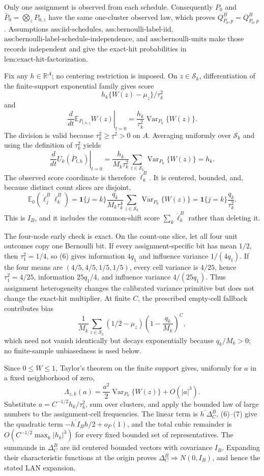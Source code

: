 Only one assignment is observed from each schedule.  Consequently \(P_0\) and \(\bar P_0=\bigotimes_zP_{0,z}\) have the same one-cluster observed law, which proves \(Q^B_{\bar P_0,p}=Q^B_{P_0,p}\).  Assumptions \(\text{ass:iid-schedules}\), \(\text{ass:bernoulli-label-iid}\), \(\text{ass:bernoulli-label-schedule-independence}\), and \(\text{ass:bernoulli-units}\) make those records independent and give the exact-hit probabilities in \(\text{lem:exact-hit-factorization}\).

Fix any \(h\in\mathbb R^A\); no centering restriction is imposed.  On \(z\in\mathcal S_k\), differentiation of the finite-support exponential family gives score
\[
h_k\{W(z)-\mu_z\}/\tau_k^2
\]
and
\[
\left.\frac d{dt}\mathbb E_{P_{t,h,z}}W(z)\right|_{t=0}
=\frac{h_k}{\tau_k^2}\operatorname{Var}_{P_0}\{W(z)\}.
\]
The division is valid because \(\tau_k^2\geq\underline\tau^2>0\) on \(A\).  Averaging uniformly over \(\mathcal S_k\) and using the definition of \(\tau_k^2\) yields
\[
\left.\frac d{dt}U_k(\bar P_{t,h})\right|_{t=0}
=\frac{h_k}{M_k\tau_k^2}\sum_{z\in\mathcal S_k}\operatorname{Var}_{P_0}\{W(z)\}=h_k. \tag{5}
\]
The observed score coordinate is therefore \(\dot\ell_k^B\).  It is centered, bounded, and, because distinct count slices are disjoint,
\[
\mathbb E_0(\dot\ell_j^B\dot\ell_k^B)
=\mathbf 1\{j=k\}\frac{q_k}{M_k\tau_k^4}
\sum_{z\in\mathcal S_k}\operatorname{Var}_{P_0}\{W(z)\}
=\mathbf 1\{j=k\}\frac{q_k}{\tau_k^2}. \tag{6}
\]
This is \(I_B\), and it includes the common-shift score \(\sum_k\dot\ell_k^B\) rather than deleting it.

The four-node early check is exact.  On the count-one slice, let all four unit outcomes copy one Bernoulli bit.  If every assignment-specific bit has mean \(1/2\), then \(\tau_1^2=1/4\), so (6) gives information \(4q_1\) and influence variance \(1/(4q_1)\).  If the four means are \((4/5,4/5,1/5,1/5)\), every cell variance is \(4/25\), hence \(\tau_1^2=4/25\), information \(25q_1/4\), and influence variance \(4/(25q_1)\).  Thus assignment heterogeneity changes the calibrated variance primitive but does not change the exact-hit multiplier.  At finite \(C\), the prescribed empty-cell fallback contributes bias
\[
\frac1{M_k}\sum_{z\in\mathcal S_k}(1/2-\mu_z)
\left(1-\frac{q_k}{M_k}\right)^C,
\]
which need not vanish identically but decays exponentially because \(q_k/M_k>0\); no finite-sample unbiasedness is used below.

Since \(0\leq W\leq1\), Taylor's theorem on the finite support gives, uniformly for \(a\) in a fixed neighborhood of zero,
\[
\Lambda_{z,k}(a)=\frac{a^2}{2}\operatorname{Var}_{P_0}\{W(z)\}+O(|a|^3). \tag{7}
\]
Substitute \(a=C^{-1/2}h_k/\tau_k^2\), sum over clusters, and apply the bounded law of large numbers to the assignment-cell frequencies.  The linear term is \(h^{\prime}\Delta_C^B\), (6)--(7) give the quadratic term \(-h^{\prime}I_Bh/2+o_P(1)\), and the total cubic remainder is \(O(C^{-1/2}\max_k|h_k|^3)\) for every fixed bounded set of representatives.  The summands in \(\Delta_C^B\) are iid centered bounded vectors with covariance \(I_B\).  Expanding their characteristic functions at the origin proves \(\Delta_C^B\Rightarrow N(0,I_B)\), and hence the stated LAN expansion.


